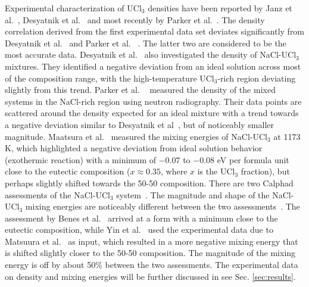 \documentclass[preprint,3p,10pt,onecolumn,number,sort&compress]{elsarticle}
\begin{document}

Experimental characterization of UCl$_3$ densities have been reported by Janz et al.~\cite{Janz1988}, Desyatnik et al.~\cite{Desyatnik} and most recently by Parker et al.~\cite{Parker}. The density correlation derived from the first experimental data set deviates significantly from Desyatnik et al.~\cite{Desyatnik} and Parker et al. ~\cite{Parker}. The latter two are considered to be the most accurate data.
Desyatnik et al.~\cite{Desyatnik} also investigated the density of NaCl-UCl$_3$ mixtures. They identified a negative deviation from an ideal solution across most of the composition range, with the high-temperature UCl$_3$-rich region deviating slightly from this trend. Parker et al. ~\cite{Parker} measured the density of the mixed systems in the NaCl-rich region using neutron radiography. Their data points are scattered around the density expected for an ideal mixture with a trend towards a negative deviation similar to Desyatnik et al~\cite{Desyatnik}, but of noticeably smaller magnitude.
Maatsura et al.~\cite{Matsuura} measured the mixing energies of NaCl-UCl$_3$ at 1173 K, which highlighted a negative deviation from ideal solution behavior (exothermic reaction) with a  minimum of $-0.07$ to $-0.08$ eV per formula unit close to the eutectic composition ($x\approx 0.35$, where $x$ is the UCl$_3$ fraction), but perhaps slightly shifted towards the 50-50 composition. There are two Calphad assessments of the NaCl-UCl$_3$ system~\cite{BENES2008, YIN2020}. The magnitude and shape of the NaCl-UCl$_3$ mixing energies are noticeably different between the two assessments~\cite{YIN2020}. The assessment by Benes et al.~\cite{BENES2008} arrived at a form with a minimum close to the eutectic composition, while Yin et al.~\cite{YIN2020} used the experimental data due to Matsuura et al.~\cite{Matsuura} as input, which resulted in a more negative mixing energy that is shifted slightly closer to the 50-50 composition. The magnitude of the mixing energy is off by about 50\% between the two assessments. The experimental data on density and mixing energies will be further discussed in see Sec. \ref{sec:results}.
\end{document}
